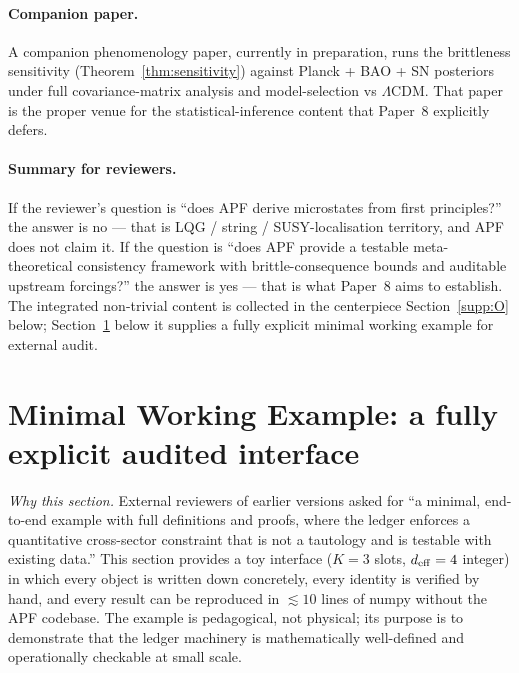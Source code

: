 \documentclass[11pt]{article}
\theoremstyle{plain}
\theoremstyle{definition}
\theoremstyle{remark}
\begin{document}
\paragraph{Companion paper.}  A companion phenomenology paper, currently in preparation, runs the brittleness sensitivity (Theorem~\ref{thm:sensitivity}) against Planck + BAO + SN posteriors under full covariance-matrix analysis and model-selection vs $\Lambda$CDM.  That paper is the proper venue for the statistical-inference content that Paper~8 explicitly defers.

\paragraph{Summary for reviewers.}  If the reviewer's question is ``does APF derive microstates from first principles?'' the answer is no --- that is LQG / string / SUSY-localisation territory, and APF does not claim it.  If the question is ``does APF provide a testable meta-theoretical consistency framework with brittle-consequence bounds and auditable upstream forcings?'' the answer is yes --- that is what Paper~8 aims to establish.  The integrated non-trivial content is collected in the centerpiece Section~\ref{supp:O} below; Section~\ref{supp:R} below it supplies a fully explicit minimal working example for external audit.

\section{Minimal Working Example: a fully explicit audited interface}\label{supp:R}

\noindent\textit{Why this section.}  External reviewers of earlier versions asked for ``a minimal, end-to-end example with full definitions and proofs, where the ledger enforces a quantitative cross-sector constraint that is not a tautology and is testable with existing data.''  This section provides a toy interface ($K = 3$ slots, $d_{\rm eff} = 4$ integer) in which every object is written down concretely, every identity is verified by hand, and every result can be reproduced in $\lesssim 10$ lines of numpy without the APF codebase.  The example is pedagogical, not physical; its purpose is to demonstrate that the ledger machinery is mathematically well-defined and operationally checkable at small scale.

\bigskip
\end{document}
